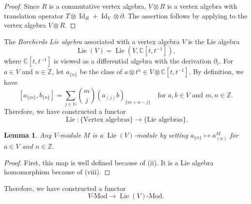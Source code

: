 \documentclass[a4paper, 12pt, reqno]{amsart}
\newtheorem{lemma}[theorem]{Lemma}
\theoremstyle{remark}
\numberwithin{equation}{subsection}
\DeclareMathOperator{\Id}{Id}
\DeclareMathOperator{\Lie}{Lie}
\begin{document}
\begin{proof}
  Since $R$ is a commutative vertex algebra, $V \otimes R$ is a vertex algebra with translation operator $T\otimes\Id_R + \Id_V\otimes\partial$.
  The assertion follows by applying  to the vertex algebra $V \otimes R$.
\end{proof}

The \emph{Borcherds Lie algebra} associated with a vertex algebra $V$ is the Lie algebra
\begin{equation*}
  \Lie(V) = \Lie(V, \mathbb{C}[t, t^{-1}]),
\end{equation*}
where $\mathbb{C}[t, t^{-1}]$ is viewed as a differential algebra with the derivation $\partial_t$.
For $a \in V$ and $n \in \mathbb{Z}$, let $a_{\{n\}}$ be the class of $a\otimes t^n \in V \otimes \mathbb{C}[t, t^{-1}]$.
By definition, we have
\begin{equation}
  \label{eq:21}
  [a_{\{m\}}, b_{\{n\}}] = \sum_{j \in \mathbb{N}}\binom{m}{j}(a_{(j)}b)_{\{m + n - j\}}\quad \text{for }a, b \in V\text{ and }m, n \in \mathbb{Z}.
\end{equation}
Therefore, we have constructed a functor
\begin{equation*}
  \Lie: \{\text{Vertex algebras}\} \to \{\text{Lie algebras}\}.
\end{equation*}

\begin{lemma}
  \label{lmm:14}
  Any $V$-module $M$ is a $\Lie(V)$-module by setting $a_{\{n\}} \mapsto a^M_{(n)}$ for $a \in V$ and $n \in \mathbb{Z}$.
\end{lemma}

\begin{proof}
  First, this map is well defined because of (ii).
  It is a Lie algebra homomorphism because of (viii).
\end{proof}

Therefore, we have constructed a functor
\begin{equation*}
  V\text{-Mod} \to \Lie(V)\text{-Mod}.
\end{equation*}
\end{document}
